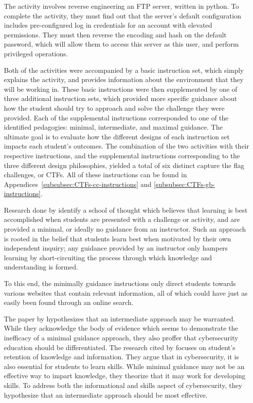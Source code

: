     The activity involves reverse engineering an FTP server, written in python. 
    To complete the activity, they must find out that the server's default configuration includes pre-configured log in credentials for an account with elevated permissions. 
    They must then reverse the encoding and hash on the default password, which will allow them to access this server as this user, and perform privileged operations. 

    Both of the activities were accompanied by a basic instruction set, which simply explains the activity, and provides information about the environment that they will be working in. 
    These basic instructions were then supplemented by one of three additional instruction sets, which provided more specific guidance about how the student should try to approach and solve the challenge they were provided. 
    Each of the supplemental instructions corresponded to one of the identified pedagogies: minimal, intermediate, and maximal guidance. 
    The ultimate goal is to evaluate how the different designs of each instruction set impacts each student's outcomes.
    The combination of the two activities with their respective instructions, and the supplemental instructions corresponding to the three different design philosophies, yielded a total of six distinct capture the flag challenges, or CTFs. 
    All of these instructions can be found in Appendices~\ref{subsubsec:CTFs-cc-instructions} and \ref{subsubsec:CTFs-gb-instructions}.

        Research done by \textcite{J-Sweller,R-Weiss} identify a school of thought which believes that learning is best accomplished when students are presented with a challenge or activity, and are provided a minimal, or ideally no guidance from an instructor. 
        Such an approach is rooted in the belief that students learn best when motivated by their own independent inquiry; 
        any guidance provided by an instructor only hampers learning by short-circuiting the process through which knowledge and understanding is formed. 

        To this end, the minimally guidance instructions only direct students towards various websites that contain relevant information, all of which could have just as easily been found through an online search. 

        The paper by \textcite{R-Weiss} hypothesizes that an intermediate approach may be warranted. 
        While they acknowledge the body of evidence which seems to demonstrate the inefficacy of a minimal guidance approach, they also proffer that cybersecurity education should be differentiated. 
        The research cited by \citeauthor{J-Sweller} focuses on student's retention of knowledge and information. 
        They argue that in cybersecurity, it is also essential for students to learn skills. While minimal guidance may not be an effective way to impart knowledge, they theorize that it may work for developing skills. 
        To address both the informational and skills aspect of cybersecurity, they hypothesize that an intermediate approach should be most effective. 

